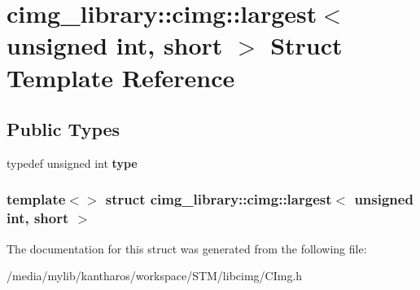 \hypertarget{structcimg__library_1_1cimg_1_1largest_3_01unsigned_01int_00_01short_01_4}{
\section{cimg\_\-library::cimg::largest$<$ unsigned int, short $>$ Struct Template Reference}
\label{structcimg__library_1_1cimg_1_1largest_3_01unsigned_01int_00_01short_01_4}
}
\subsection*{Public Types}
\begin{DoxyCompactItemize}
\item 
\hypertarget{structcimg__library_1_1cimg_1_1largest_3_01unsigned_01int_00_01short_01_4_a8658421c89bd8e0f11f35163cfa3f879}{
typedef unsigned int {\bfseries type}}
\label{structcimg__library_1_1cimg_1_1largest_3_01unsigned_01int_00_01short_01_4_a8658421c89bd8e0f11f35163cfa3f879}

\end{DoxyCompactItemize}
\subsubsection*{template$<$$>$ struct cimg\_\-library::cimg::largest$<$ unsigned int, short $>$}



The documentation for this struct was generated from the following file:\begin{DoxyCompactItemize}
\item 
/media/mylib/kantharos/workspace/STM/libcimg/CImg.h\end{DoxyCompactItemize}
